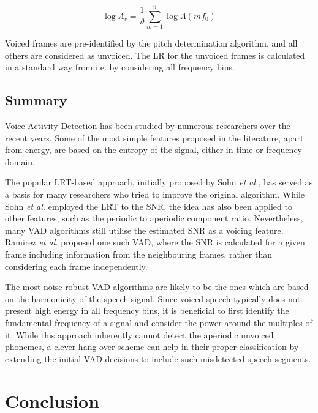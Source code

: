 \begin{equation}
\log \Lambda_v = \frac{1}{\vartheta} \sum_{m=1}^{\vartheta} \log \Lambda(m f_0)
\label{eq:harmfreq}
\end{equation}

Voiced frames are pre-identified by the pitch determination algorithm, and all others are considered as unvoiced. The LR for the unvoiced frames is calculated in a standard way from \cite{SohnInitial} i.e. by considering all frequency bins.

\subsection{Summary}

Voice Activity Detection has been studied by numerous researchers over the recent years. Some of the most simple features proposed in the literature, apart from energy, are based on the entropy of the signal, either in time or frequency domain.

The popular LRT-based approach, initially proposed by Sohn \emph{et al.}, has served as a basis for many researchers who tried to improve the original algorithm. While Sohn \emph{et al.} employed the LRT to the SNR, the idea has also been applied to other features, such as the periodic to aperiodic component ratio. Nevertheless, many VAD algorithms still utilise the estimated SNR as a voicing feature. Ramirez \emph{et al.} proposed one such VAD, where the SNR is calculated for a given frame including information from the neighbouring frames, rather than considering each frame independently.

The most noise-robust VAD algorithms are likely to be the ones which are based on the harmonicity of the speech signal. Since voiced speech typically does not present high energy in all frequency bins, it is beneficial to first identify the fundamental frequency of a signal and consider the power around the multiples of it. While this approach inherently cannot detect the aperiodic unvoiced phonemes, a clever hang-over scheme can help in their proper classification by extending the initial VAD decisions to include such misdetected speech segments.


\section{Conclusion}

